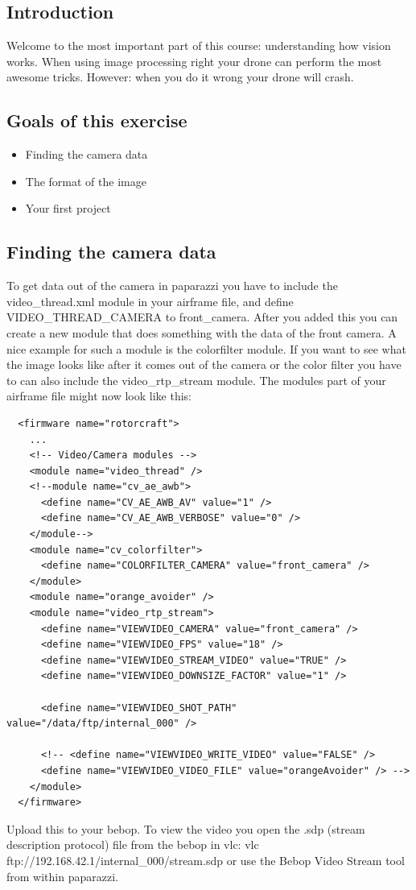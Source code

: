 \documentclass{article}
\begin{document}

\subsection*{Introduction}
Welcome to the most important part of this course: understanding how vision works. When using image processing right your drone can perform the most awesome tricks. However: when you do it wrong your drone will crash. 

\subsection*{Goals of this exercise}
\begin{itemize}
\item Finding the camera data
\item The format of the image
\item Your first project
\end{itemize}

\subsection*{Finding the camera data}
To get data out of the camera in paparazzi you have to include the video\_thread.xml module in your airframe file, and define VIDEO\_THREAD\_CAMERA to front\_camera. After you added this you can create a new module that does something with the data of the front camera. A nice example for such a module is the colorfilter module.
If you want to see what the image looks like after it comes out of the camera or the color filter you have to can also include the video\_rtp\_stream  module. 
The modules part of your airframe file might now look like this:
\begin{verbatim}
  <firmware name="rotorcraft">
    ...
    <!-- Video/Camera modules -->
    <module name="video_thread" />
    <!--module name="cv_ae_awb">
      <define name="CV_AE_AWB_AV" value="1" />
      <define name="CV_AE_AWB_VERBOSE" value="0" />
    </module-->
    <module name="cv_colorfilter">
      <define name="COLORFILTER_CAMERA" value="front_camera" />
    </module>
    <module name="orange_avoider" />
    <module name="video_rtp_stream">
      <define name="VIEWVIDEO_CAMERA" value="front_camera" />
      <define name="VIEWVIDEO_FPS" value="18" />
      <define name="VIEWVIDEO_STREAM_VIDEO" value="TRUE" />
      <define name="VIEWVIDEO_DOWNSIZE_FACTOR" value="1" />
      
      <define name="VIEWVIDEO_SHOT_PATH" value="/data/ftp/internal_000" />
      
      <!-- <define name="VIEWVIDEO_WRITE_VIDEO" value="FALSE" />
      <define name="VIEWVIDEO_VIDEO_FILE" value="orangeAvoider" /> -->
    </module>
  </firmware>
\end{verbatim}
Upload this to your bebop. To view the video you open the .sdp (stream description protocol) file from the bebop in vlc: vlc ftp://192.168.42.1/internal\_000/stream.sdp or use the Bebop Video Stream tool from within paparazzi.
 
\end{document}
